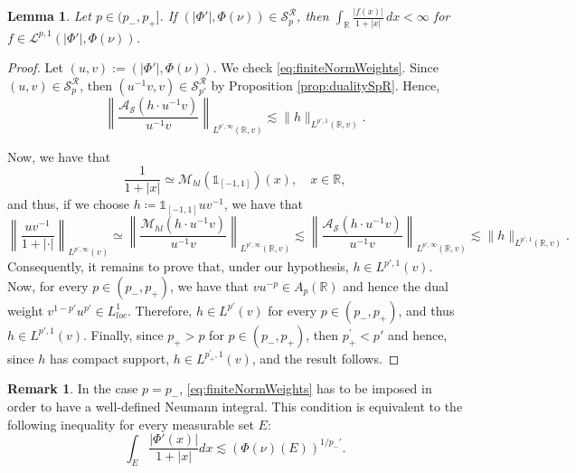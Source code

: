 \documentclass[12pt]{amsart}
\newcommand{\R}{\mathbb{R}}
\theoremstyle{plain}
\newtheorem{lemma}[theorem]{Lemma}
\theoremstyle{definition}
\newtheorem{remark}[theorem]{Remark}
\numberwithin{equation}{section}
\begin{document}
\begin{lemma} \label{lemma:wellDefined_Sp+R} Let $p\in (p_-, p_+]$.  If $(|\Phi'|,\Phi(\nu))\in \mathcal{S}_{p}^{\mathcal{R}}$, then   $\int_{\R}\frac{|f(x)|}{1+|x|}\, dx<\infty$ for $f\in \mathcal{L}^{p,1}(|\Phi'|,\Phi(\nu))$.
\end{lemma}

\begin{proof} 

Let $(u,v):=(|\Phi'|,\Phi(\nu))$. We check \eqref{eq:finiteNormWeights}. Since $(u,v)\in \mathcal{S}_{p}^{\mathcal{R}}$, then $(u^{-1}v,v)\in \mathcal{S}_{p'}^{\mathcal{R}}$ by Proposition \ref{prop:dualitySpR}. Hence, 
\begin{equation}\label{eq:dualEstimate}
\left\|
\frac{\mathcal{A}_{\mathcal{S}}(h\cdot u^{-1}v)}{u^{-1}v}
\right\|_{L^{p',\infty}(\R,v)}
\lesssim 
\|h\|_{L^{p',1}(\R,v)}.    
\end{equation}

Now, we have that 
\[
\frac{1}{1+|x|}
\simeq 
\mathcal{M}_{hl}(\mathds{1}_{[-1,1]})(x),\quad x\in\R,
\]
and thus,  if we choose $h\coloneqq \mathds{1}_{[-1,1]}uv^{-1}$, we have that
\[
\left\|\frac{uv^{-1}}{1+|\cdot|}\right\|_{L^{p',\infty}(v)}
\simeq
\left\|
\frac{\mathcal{M}_{hl}(h\cdot u^{-1}v)}{u^{-1}v}
\right\|_{L^{p',\infty}(\R,v)}
\lesssim 
\left\|
\frac{\mathcal{A}_{\mathcal{S}}(h\cdot u^{-1}v)}{u^{-1}v}
\right\|_{L^{p',\infty}(\R,v)}
\lesssim 
\|h\|_{L^{p',1}(\R,v)}.
\]
Consequently, it remains to prove that, under our hypothesis,  $h\in L^{p',1}(v)$. Now, for every  $p\in (p_{-},p_{+})$, we have that $vu^{-p}\in A_p(\R)$ and hence the dual weight $v^{1-p'}u^{p'}\in L^1_{loc}$. Therefore,  $h\in L^{p'}(v)$ for every  $p\in (p_{-},p_{+})$, and thus $h\in L^{p', 1}(v)$. Finally, since $p_{+}>p$ for $p\in (p_{-},p_{+})$, then $p_{+}^{\prime}<p'$ and hence, since $h$ has compact support, 
$h\in L^{p_{+}^{\prime}, 1}(v)$, and the result follows.
\end{proof}

\begin{remark}
In the case $p=p_-$, \eqref{eq:finiteNormWeights} has to be imposed in order to have a well-defined Neumann integral. This condition is equivalent to the following inequality for every measurable set $E$: 
\begin{equation}\label{eq:conditionForWellDefined}
 \int_E \frac{|\Phi'(x)|}{1+|x|} dx \lesssim \left(\Phi(\nu)(E)\right)^{1/p_-'}.
\end{equation}
\end{remark}
\end{document}

